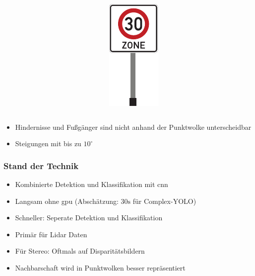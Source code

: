 \begin{frame}
\begin{columns}
\begin{column}{.33\textwidth}
        \end{column}
        \pause
        \begin{column}{.33\textwidth}
            \includegraphics[height=.45\textheight]{../Material/Presentation/Sign.pdf}
        \end{column}
    \end{columns}
    \pause
    \begin{itemize}
        \item Hindernisse und Fußgänger sind nicht anhand der Punktwolke unterscheidbar
            \pause
        \item Steigungen mit bis zu $10^\circ$
    \end{itemize}
\end{frame}

\begin{frame}
    \frametitle{Stand der Technik}
    \begin{itemize}
        \item Kombinierte Detektion und Klassifikation mit \acf{cnn}
            \pause
        \item Langsam ohne \ac{gpu} (Abschätzung: $30\si{\s}$ für Complex-YOLO)
            \pause
        \item Schneller: Seperate Detektion und Klassifikation
            \pause
        \item Primär für Lidar Daten
            \pause
        \item Für Stereo: Oftmals auf Disparitätsbildern
            \pause
        \item Nachbarschaft wird in Punktwolken besser repräsentiert 
    \end{itemize}
\end{frame}

